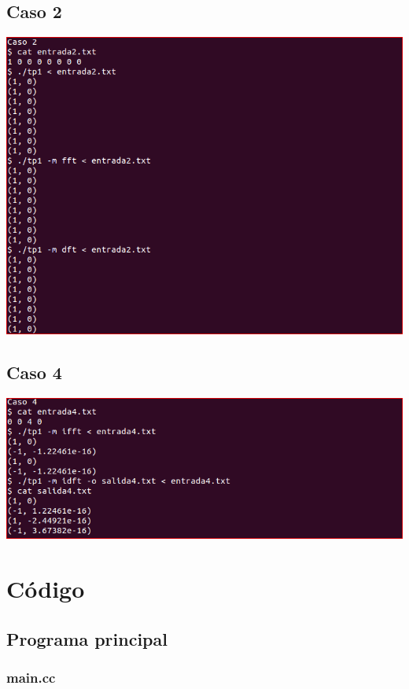 \documentclass{article}
\begin{document}
  \subsection{Caso 2}
    \begin{center}
      \includegraphics[width=0.8\paperwidth]{Imagenes/caso_2}
    \end{center}

  \subsection{Caso 4}
    \begin{center}
      \includegraphics[width=0.8\paperwidth]{Imagenes/caso_4}
    \end{center}

\section{Código}
  \subsection{Programa principal}
    \subsubsection{main.cc}
      
  
\end{document}

